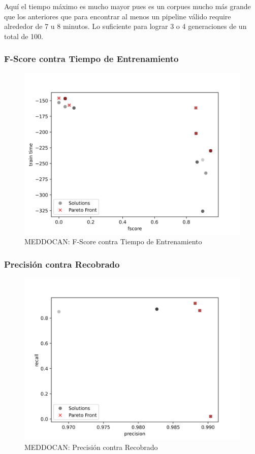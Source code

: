 Aqu\'i el tiempo m\'aximo es mucho mayor pues es un corpues mucho m\'as grande que los anteriores que para encontrar al menos un pipeline v\'alido require alrededor de 7 u 8 minutos. Lo suficiente para lograr 3 o 4 generaciones de un total de 100.


\subsubsection{F-Score contra Tiempo de Entrenamiento}
\begin{figure}[ht]
    \centering
    \includegraphics[scale=0.75]{Pictures/meddocan_fscore_vs_train.jpg}
    \caption{MEDDOCAN: F-Score contra Tiempo de Entrenamiento}
    \label{impl:fig:MEDDOCAN:fscore_vs_train_time}
\end{figure}


\subsubsection{Precisi\'on contra Recobrado}

\begin{figure}[ht]
    \centering
    \includegraphics[scale=0.75]{Pictures/meddocan_precision_vs_recall.jpg}
    \caption{MEDDOCAN: Precisi\'on contra Recobrado}
    \label{impl:fig:MEDDOCAN:precision_vs_recall}
\end{figure}

